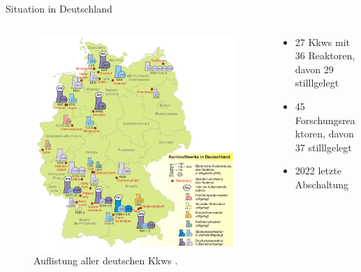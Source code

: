 \begin{frame}{ Situation in Deutschland }
  \begin{columns}

    \begin{column}{0.48\textwidth}
      \begin{figure}
        \centering
        \includegraphics[width=1\textwidth]{./bilder/Kernkraftwerke_in_Deutschland.png}
        \caption{ Auflistung aller deutschen Kkws \cite{karte_abschaltungen}. }
        \label{ fig: karte_abschaltungen }
      \end{figure}
    \end{column}

    \begin{column}{0.48\textwidth}
      \begin{itemize}
        \setlength\itemsep{1.2em}
          \item{ 27 Kkws mit 36 Reaktoren, davon 29 stilllgelegt }
          \item{ 45 Forschungsreaktoren, davon 37 stilllgelegt}
          \item{ 2022 letzte Abschaltung }
        \end{itemize}
    \end{column}
  \end{columns}
\end{frame}



